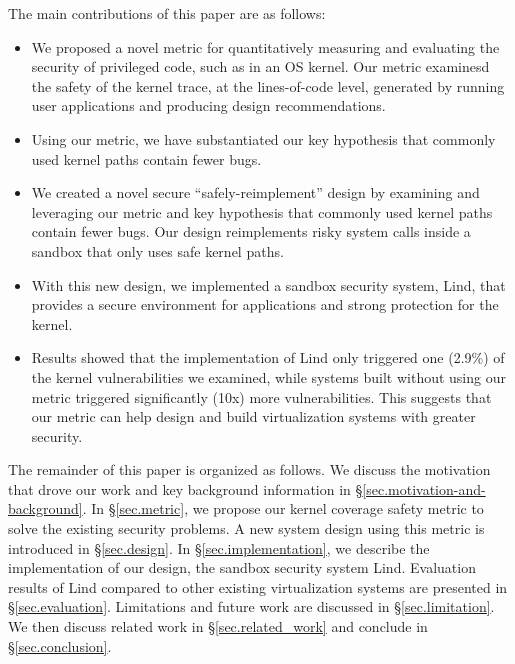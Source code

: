 The main contributions of this paper are as follows: 
\begin{itemize}
\item We proposed a novel metric for quantitatively measuring and evaluating the
security of privileged code, such as in an OS kernel. Our metric examinesd
the safety of the kernel trace, at the lines-of-code level, generated by
running user applications and producing design recommendations.
\item Using our metric, we have substantiated our key hypothesis that commonly
used kernel paths contain fewer bugs. 
\item We created a novel secure “safely-reimplement” design by examining and
leveraging our metric and key hypothesis that commonly used kernel paths
contain fewer bugs. Our design reimplements risky system calls inside a
sandbox that only uses safe kernel paths. 
\item With this new design, we implemented a sandbox security system, Lind, that
provides a secure environment for applications and strong protection for
the kernel.
\item Results showed that the implementation of Lind only triggered one (2.9\%) of
the kernel vulnerabilities we examined, while systems built without using
our metric triggered significantly (10x) more vulnerabilities. This
suggests that our metric can help design and build virtualization systems
with greater security. 
\end{itemize}


The remainder of this paper is organized as follows. 
We discuss the motivation that drove our work and key background information 
in \S{\ref{sec.motivation-and-background}}. 
In \S{\ref{sec.metric}}, we propose our kernel coverage safety metric to solve 
the existing security problems.  A new system design using this metric is 
introduced in \S{\ref{sec.design}}. In \S{\ref{sec.implementation}}, 
we describe the implementation of our design, the sandbox security 
system Lind. Evaluation results of Lind compared to other existing 
virtualization systems are presented in \S{\ref{sec.evaluation}}. 
Limitations and future work are discussed in \S{\ref{sec.limitation}}.  
We then discuss related work in \S{\ref{sec.related_work}} and conclude
in \S{\ref{sec.conclusion}}.

